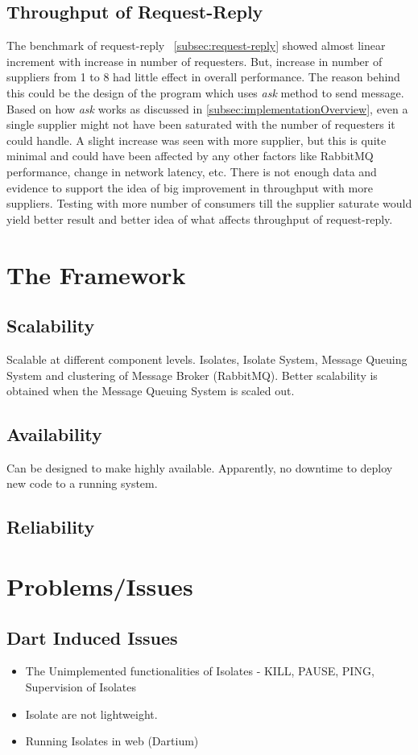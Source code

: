 \subsection{Throughput of Request-Reply}
  The benchmark of request-reply ~\autoref{subsec:request-reply} showed almost linear increment with increase in number of requesters. But, increase in number of suppliers from 1 to 8 had little effect in overall performance. The reason behind this could be the design of the program which uses \emph{ask} method to send message. Based on how \emph{ask} works as discussed in \autoref{subsec:implementationOverview}, even a single supplier might not have been saturated with the number of requesters it could handle. A slight increase was seen with more supplier, but this is quite minimal and could have been affected by any other factors like RabbitMQ performance, change in network latency, etc. There is not enough data and evidence to support the idea of big improvement in throughput with more suppliers. Testing with more number of consumers till the supplier saturate would yield better result and better idea of what affects throughput of request-reply.


\section{The Framework}

\subsection{Scalability}
    Scalable at different component levels. Isolates, Isolate System, Message Queuing System and clustering of Message Broker (RabbitMQ). Better scalability is obtained when the Message Queuing System is scaled out.

\subsection{Availability}
    Can be designed to make highly available. Apparently, no downtime to deploy new code to a running system.

  \subsection{Reliability}


\section{Problems/Issues}
\subsection{Dart Induced Issues}
  \begin{itemize}
  \item The Unimplemented functionalities of Isolates
    - KILL, PAUSE, PING, Supervision of Isolates
  \item Isolate are not lightweight.
  \item Running Isolates in web (Dartium)
\end{itemize}
